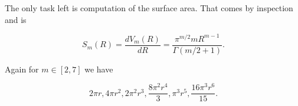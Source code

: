 {%
The only task left is computation of the surface area.  That comes by inspection and is

\begin{equation}\label{eqn:basicStatMechProblemSet3Problem1:560}
S_{m}(R) 
=\frac{d V_m(R)}{d R}
= \frac{\pi^{m/2} m R^{m-1}}{\Gamma\left( m/2 + 1 \right)}.
\end{equation}

Again for $m \in [2, 7]$ we have

\begin{equation}\label{eqn:basicStatMechProblemSet3Problem1:600}
2 \pi  r,4 \pi  r^2,2 \pi ^2 r^3,\frac{8 \pi ^2 r^4}{3},\pi ^3 r^5,\frac{16 \pi ^3 r^6}{15}.
\end{equation}
}
